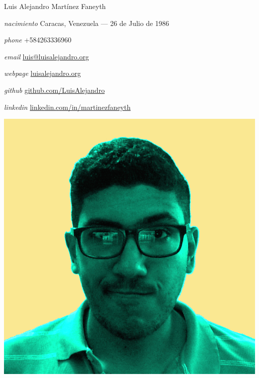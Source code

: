 \documentclass[11pt,letterpaper]{article}
\begin{document}
\begin{cv}{Luis Alejandro Mart\'inez Faneyth}
\vspace{1em}

\begin{minipage}{.7\linewidth}
\begin{cvlist}{}
\item[\textit{\large{nacimiento}}]{Caracas, Venezuela --- 26 de Julio de 1986}
\item[\textit{\large{phone}}]{+584263336960}
\item[\textit{\large{email}}]{\href{mailto:luis@luisalejandro.org}{luis@luisalejandro.org}}
\item[\textit{\large{webpage}}]{\href{http://luisalejandro.org}{luisalejandro.org}}
\item[\textit{\large{github}}]{\href{http://github.com/LuisAlejandro}{github.com/LuisAlejandro}}
\item[\textit{\large{linkedin}}]{\href{https://www.linkedin.com/in/martinezfaneyth}{linkedin.com/in/martinezfaneyth}}
\end{cvlist}
\end{minipage}
\begin{minipage}{.3\linewidth}
\includegraphics[scale=0.15]{curriculumvitae.jpg}
\end{minipage}
\vspace{1em}


\end{cv}
\end{document}
